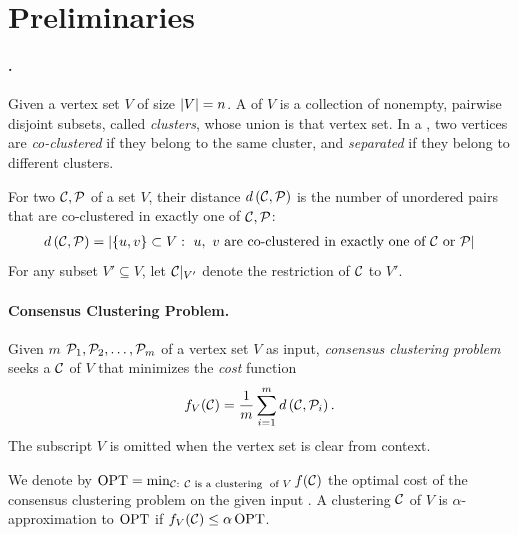 \section{Preliminaries} \label{sec:preliminaries}

\paragraph{\texorpdfstring{\Clusterings}{Clusterings}.}
Given a vertex set $ V $ of size $ \left\lvert V\right\rvert = n $.
A \emph{\clustering} of $ V $ is a collection of nonempty, pairwise
disjoint subsets, called \emph{clusters}, whose union is that vertex set.
In a \clustering, two vertices are \emph{co-clustered} if they belong to
the same cluster, and \emph{separated} if they belong to different clusters.

For two \clusterings $ \mathcal{C}, \mathcal{P} $ of a set $ V $, their distance $ d\left(\mathcal{C}, \mathcal{P}\right)$ is the number of unordered pairs that are co-clustered in exactly one of $ \mathcal{C},\mathcal{P} $:
\begin{align}
    d\left(\mathcal{C}, \mathcal{P}\right) = \left\lvert\{ u,v \}\subset V:\ u,\ v \text{ are co-clustered in exactly one of } \mathcal{C} \text{ or } \mathcal{P}\right\rvert \nonumber
\end{align}
For any subset $ V'\subseteq V $, let $ \mathcal{C}|_{V'} $ denote the restriction of $ \mathcal{C} $ to $ V' $.

\paragraph{Consensus Clustering Problem.}\label{par:consensus_clustering_} %
Given $ m $ \clusterings $ \inpcls{1}, \inpcls{2}, \dots, \inpcls{m} $ of a vertex set $ V $ as input, \emph{consensus clustering problem} seeks a \clustering $ \mathcal{C} $ of $ V $ that minimizes the \emph{cost} function
\begin{align}
    \cost_{ V }(\cls{C}) = \dfrac{1}{m} \sum_{i=1}^{m} \dist{\cls{C}, \inpcls{i}} .\nonumber
\end{align}
The subscript $ V $ is omitted when the vertex set is clear from context.

We denote by $ \OPT = \min_{\cls{C}:\ \cls{C} \text{ is a \clustering\ } \text{ of } V}\cost(\cls{C}) $ the optimal cost of the consensus clustering problem on the given input \clusterings.
A clustering $ \mathcal{C} $ of $ V $ is $ \alpha $-approximation to $ \operatorname{OPT} $ if $ f_{V}(\mathcal{C}) \leq \alpha \operatorname{OPT} $.

